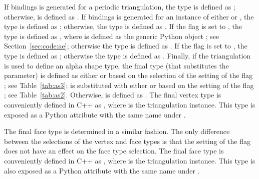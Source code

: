 If bindings is generated for a periodic triangulation, the type
 is defined as
;
otherwise,  is defined as
.
%
If bindings is generated for an instance of either
 or
,
the type  is defined as
;
otherwise, the type  is defined as
.
%
If the \cmake{} flag  is set
to , the type  is defined as
, where  is defined as the generic Python
object ; see Section~\ref{sec:code:ae};
otherwise the type  is defined as .
%
If the \cmake{} flag  is set
to , the type  is defined as
; otherwise
the type  is defined as .
%
Finally, if the triangulation is used to define an alpha shape type,
the final type  (that substitutes the
 parameter) is defined as either
 or
 based on the selection of the setting of the
\cmake{} flag ; see Table~\ref{tab:as3};
 is substituted with either
 or  based on the setting of
the \cmake{} flag ; see
Table~\ref{tab:as2}. Otherwise,  is defined as
.
%
The final vertex type is conveniently defined in C++ as
, where  is the
triangulation instance. This type is exposed as a Python attribute
with the same name under .

The final face type is determined in a similar fashion. The only
difference between the selections of the vertex and face types is that
the setting of the \cmake{} flag  does
not have an effect on the face type selection. The final face type is
conveniently defined in C++ as , where
 is the triangulation instance. This type is also
exposed as a Python attribute with the same name under
.

